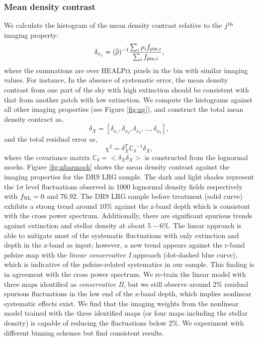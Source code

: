 \subsubsection{Mean density contrast}
We calculate the histogram of the mean density contrast relative to the $j^{\rm th}$ imaging property:
\begin{equation}
\delta_{x_{j}} = ({\hat{\overline{\rho}}})^{-1} \frac{\sum_{i} \rho_{i} f_{{\rm pix}, i}}{\sum_{i} f_{{\rm pix}, i}},
\end{equation}
where the summations are over \textsc{HEALPix} pixels in the bin with similar imaging values. For instance, In the absence of systematic error, the mean density contrast from one part of the sky with high extinction should be consistent with that from another patch with low extinction. We compute the histograms against all other imaging properties (see Figure \ref{fig:ng}), and construct the total mean density contract as,
\begin{equation}
\delta_{X} = [\delta_{x_{1}}, \delta_{x_{2}}, \delta_{x_{3}}, ..., \delta_{x_{9}}],
\end{equation}
and the total residual error as,
\begin{equation}
\chi^{2} = \delta_{X}^{T} \mathbb{C_{\delta}}^{-1} \delta_{X},
\end{equation}
where the covariance matrix $\mathbb{C}_{\delta} = < \delta_{X} \delta_{X}>$ is constructed from the lognormal mocks. Figure \ref{fig:nbarmock} shows the mean density contrast against the imaging properties for the DR9 LRG sample. The dark and light shades represent the $1\sigma$ level fluctuations observed in 1000 lognormal density fields respectively with $f_{\rm NL}=0$ and $76.92$. The DR9 LRG sample before treatment (solid curve) exhibits a strong trend around $10\%$ against the z-band depth which is consistent with the cross power spectrum. Additionally, there are significant spurious trends against extinction and stellar density at about $5-6\%$. The linear approach is able to mitigate most of the systematic fluctuations with only extinction and depth in the z-band as input; however,  a new trend appears against the r-band psfsize map with the \textit{linear conservative I} approach (dot-dashed blue curve), which is indicative of the psfsize-related systematics in our sample. This finding is in agreement with the cross power spectrum. We re-train the linear model with three maps identified as \textit{conservative II}, but we still observe around $2\%$ residual spurious fluctuations in the low end of the z-band depth, which implies nonlinear systematic effects exist. We find that the imaging weights from the nonlinear model trained with the three identified maps (or four maps including the stellar density) is capable of reducing the fluctuations below $2\%$. We experiment with different binning schemes but find consistent results.

